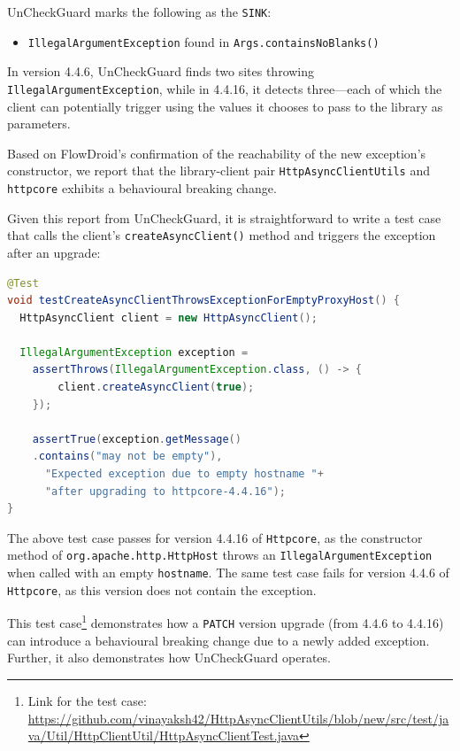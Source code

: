 UnCheckGuard marks the following as the \texttt{SINK}:
\begin{itemize}
  \item \texttt{IllegalArgumentException} found in \texttt{Args.containsNoBlanks()}
\end{itemize}

In version 4.4.6, UnCheckGuard finds two sites throwing \texttt{IllegalArgumentException}, while in 4.4.16, it detects three—each of which the client can potentially trigger using the values it chooses to pass to the library as parameters.

Based on FlowDroid's confirmation of the reachability of the new exception's constructor, we report that the library-client pair \texttt{HttpAsyncClientUtils} and \texttt{httpcore} exhibits a behavioural breaking change.

Given this report from UnCheckGuard, it is straightforward to write a test case that calls the client's \texttt{createAsyncClient()} method
and triggers the exception after an upgrade:
\begin{lstlisting}[language=Java]
@Test
void testCreateAsyncClientThrowsExceptionForEmptyProxyHost() {
  HttpAsyncClient client = new HttpAsyncClient();

  IllegalArgumentException exception =
    assertThrows(IllegalArgumentException.class, () -> {
        client.createAsyncClient(true);
    });

    assertTrue(exception.getMessage()
    .contains("may not be empty"),
      "Expected exception due to empty hostname "+
      "after upgrading to httpcore-4.4.16");
}
\end{lstlisting}

The above test case passes for version 4.4.16 of \texttt{Httpcore}, as the constructor method of \texttt{org.apache.http.HttpHost} throws an \texttt{IllegalArgumentException} when called with an empty \texttt{hostname}. The same test case fails for version 4.4.6 of \texttt{Httpcore}, as this version does not contain the exception.

This test case\footnote{Link for the test case: \url{https://github.com/vinayaksh42/HttpAsyncClientUtils/blob/new/src/test/java/Util/HttpClientUtil/HttpAsyncClientTest.java}} demonstrates how a \texttt{PATCH} version upgrade (from 4.4.6 to 4.4.16) can introduce a behavioural breaking change due to a newly added exception. Further, it also demonstrates how UnCheckGuard operates.